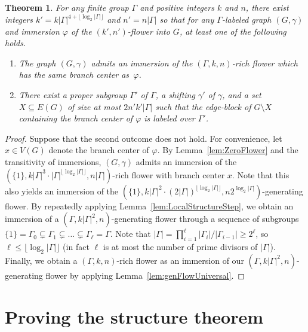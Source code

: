 \documentclass[11pt]{article}
\newtheorem{thm}{Theorem}[section]
\theoremstyle{definition}
\begin{document}
\begin{thm}
\label{thm:enrichingFlower}
    For any finite group $\Gamma$ and positive integers $k$ and $n$, there exist integers $k' = k|\Gamma|^{4 + \lfloor\log_2 |\Gamma|\rfloor}$ and $n' = n|\Gamma|$ so that for any $\Gamma$-labeled graph $(G, \gamma)$ and immersion $\varphi$ of the $(k', n')$-flower into $G$, at least one of the following holds.
    \begin{enumerate}
        \item The graph $(G, \gamma)$ admits an immersion of the $(\Gamma, k, n)$-rich flower which has the same branch center as~$\varphi$.
        \item\label{itm:EF2} There exist a proper subgroup $\Gamma'$ of $\Gamma$, a shifting $\gamma'$ of $\gamma$, and a set $X \subseteq E(G)$ of size at most $2n'k'|\Gamma|$ such that the edge-block of $G\setminus X$ containing the branch center of $\varphi$ is labeled over $\Gamma'$.
    \end{enumerate}
\end{thm}
\begin{proof}
    Suppose that the second outcome does not hold. For convenience, let $x \in V(G)$ denote the branch center of $\varphi$. By Lemma~\ref{lem:ZeroFlower} and the transitivity of immersions, $(G, \gamma)$ admits an immersion of the $(\{1\}, k|\Gamma|^3 \cdot |\Gamma|^{\lfloor\log_2 |\Gamma|\rfloor}, n|\Gamma|)$-rich flower with branch center $x$. Note that this also yields an immersion of the $(\{1\}, k |\Gamma|^2 \cdot (2|\Gamma|)^{\lfloor\log_2 |\Gamma|\rfloor}, n2^{\log_2|\Gamma|})$-generating flower. By repeatedly applying Lemma~\ref{lem:LocalStructureStep}, we obtain an immersion of a $(\Gamma, k|\Gamma|^2, n)$-generating flower through a sequence of subgroups $\{1\} =\Gamma_0 \subsetneq \Gamma_1 \subsetneq \dots \subsetneq \Gamma_\ell = \Gamma$. Note that $|\Gamma| = \prod_{i=1}^\ell |\Gamma_i| / |\Gamma_{i-1}| \geq 2^\ell$, so $\ell \leq \lfloor\log_2|\Gamma|\rfloor$ (in fact $\ell$ is at most the number of prime divisors of $|\Gamma|$). Finally, we obtain a $(\Gamma, k, n)$-rich flower as an immersion of our $(\Gamma, k|\Gamma|^2, n)$-generating flower by applying Lemma~\ref{lem:genFlowUniversal}. 
\end{proof}


\section{Proving the structure theorem}
\label{sec:strThm}
\end{document}
